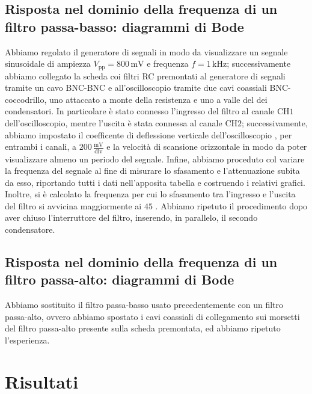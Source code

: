 \documentclass[a4paper]{article}
\begin{document}
		\subsection{Risposta nel dominio della frequenza di un filtro passa-basso: diagrammi di Bode}
			Abbiamo regolato il generatore di segnali in modo da visualizzare un segnale sinusoidale di ampiezza $ V_{\mathrm{pp}} = 800 \, \mathrm{mV} $ e frequenza $ f = 1 \, \mathrm{kHz} $; successivamente abbiamo collegato la scheda coi filtri RC premontati al generatore di segnali tramite un cavo BNC-BNC e all'oscilloscopio tramite due cavi coassiali BNC-coccodrillo, uno attaccato a monte della resistenza e uno a valle del dei condensatori.
			\newline
			In particolare è stato connesso l'ingresso del filtro al canale $ \mathrm{CH1} $ dell'oscilloscopio, mentre l'uscita è stata connessa al canale $ \mathrm{CH2} $; successivamente, abbiamo impostato il coefficente di deflessione verticale dell'oscilloscopio , per entrambi i canali, a $ 200 \, \mathrm{\frac{mV}{div}} $ e la velocità di scansione orizzontale in modo da poter visualizzare almeno un periodo del segnale.
			\newline
			Infine, abbiamo proceduto col variare la frequenza del segnale al fine di misurare lo sfasamento e l'attenuazione subita da esso, riportando tutti i dati nell'apposita tabella e costruendo i relativi grafici. Inoltre, si è calcolato la frequenza per cui lo sfasamento tra l'ingresso e l'uscita del filtro si avvicina maggiormente ai $ 45 $ \textdegree.
			\newline
			Abbiamo ripetuto il procedimento dopo aver chiuso l'interruttore del filtro, inserendo, in parallelo, il secondo condensatore.
		\subsection{Risposta nel dominio della frequenza di un filtro passa-alto: diagrammi di Bode}
			Abbiamo sostituito il filtro passa-basso usato precedentemente con un filtro passa-alto, ovvero abbiamo spostato i cavi coassiali di collegamento sui morsetti del filtro passa-alto presente sulla scheda premontata, ed abbiamo ripetuto l'esperienza.
	\section{Risultati}
\end{document}
